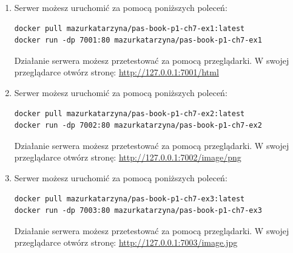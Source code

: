 \begin{enumerate}[label=\textbf{7.\arabic*}]\setlength{\itemsep}{1em}
\item Serwer możesz uruchomić za pomocą poniższych poleceń:

\begin{verbatim}
docker pull mazurkatarzyna/pas-book-p1-ch7-ex1:latest
docker run -dp 7001:80 mazurkatarzyna/pas-book-p1-ch7-ex1
\end{verbatim}

\noindent Działanie serwera możesz przetestować za pomocą przeglądarki. W swojej przeglądarce otwórz stronę: \url{http://127.0.0.1:7001/html}

\item Serwer możesz uruchomić za pomocą poniższych poleceń:

\begin{verbatim}
docker pull mazurkatarzyna/pas-book-p1-ch7-ex2:latest
docker run -dp 7002:80 mazurkatarzyna/pas-book-p1-ch7-ex2
\end{verbatim}

\noindent Działanie serwera możesz przetestować za pomocą przeglądarki. W swojej przeglądarce otwórz stronę: \url{http://127.0.0.1:7002/image/png}

\item Serwer możesz uruchomić za pomocą poniższych poleceń:

\begin{verbatim}
docker pull mazurkatarzyna/pas-book-p1-ch7-ex3:latest
docker run -dp 7003:80 mazurkatarzyna/pas-book-p1-ch7-ex3
\end{verbatim}

\noindent Działanie serwera możesz przetestować za pomocą przeglądarki. W swojej przeglądarce otwórz stronę: \url{http://127.0.0.1:7003/image.jpg}

\end{enumerate}

